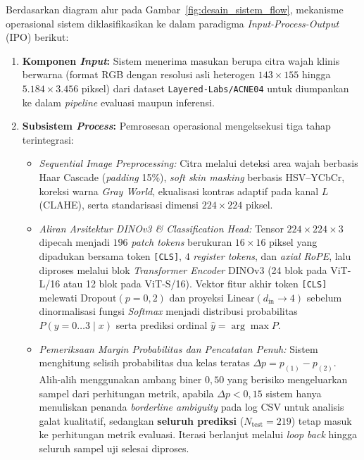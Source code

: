Berdasarkan diagram alur pada Gambar~\ref{fig:desain_sistem_flow}, mekanisme operasional sistem diklasifikasikan ke dalam paradigma \textit{Input-Process-Output} (IPO) berikut:
\begin{enumerate}
    \item \textbf{Komponen \textit{Input}:}
          Sistem menerima masukan berupa citra wajah klinis berwarna (format RGB dengan resolusi asli heterogen $143\times 155$ hingga $5.184\times 3.456$ piksel) dari dataset \texttt{Layered-Labs/ACNE04} \cite{wu2019, layeredlabs2026acne04} untuk diumpankan ke dalam \textit{pipeline} evaluasi maupun inferensi.

    \item \textbf{Subsistem \textit{Process}:}
          Pemrosesan operasional mengeksekusi tiga tahap terintegrasi:
          \begin{itemize}
              \item \textit{Sequential Image Preprocessing:} Citra melalui deteksi area wajah berbasis Haar Cascade (\textit{padding} 15\%), \textit{soft skin masking} berbasis HSV--YCbCr, koreksi warna \textit{Gray World}, ekualisasi kontras adaptif pada kanal $L$ (CLAHE), serta standarisasi dimensi $224\times224$ piksel.
              \item \textit{Aliran Arsitektur DINOv3 \& Classification Head:} Tensor $224\times224\times3$ dipecah menjadi $196$ \textit{patch tokens} berukuran $16\times16$ piksel yang dipadukan bersama token \texttt{[CLS]}, $4$ \textit{register tokens}, dan \textit{axial RoPE}, lalu diproses melalui blok \textit{Transformer Encoder} DINOv3 (24 blok pada ViT-L/16 atau 12 blok pada ViT-S/16). Vektor fitur akhir token \texttt{[CLS]} melewati $\mathrm{Dropout}(p=0,2)$ dan proyeksi $\mathrm{Linear}(d_{\text{in}} \rightarrow 4)$ sebelum dinormalisasi fungsi \textit{Softmax} menjadi distribusi probabilitas $P(y=0\ldots3 \mid x)$ serta prediksi ordinal $\hat{y} = \arg\max P$.
              \item \textit{Pemeriksaan Margin Probabilitas dan Pencatatan Penuh:} Sistem menghitung selisih probabilitas dua kelas teratas $\Delta p = p_{(1)} - p_{(2)}$. Alih-alih menggunakan ambang biner $0,50$ yang berisiko mengeluarkan sampel dari perhitungan metrik, apabila $\Delta p < 0,15$ sistem hanya menuliskan penanda \textit{borderline ambiguity} pada log CSV untuk analisis galat kualitatif, sedangkan \textbf{seluruh prediksi} ($N_{\text{test}} = 219$) tetap masuk ke perhitungan metrik evaluasi. Iterasi berlanjut melalui \textit{loop back} hingga seluruh sampel uji selesai diproses.
          \end{itemize}


\end{enumerate}
